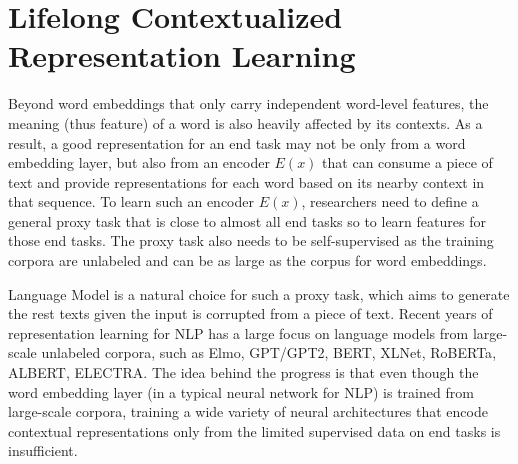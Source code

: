 

\chapter{Lifelong Contextualized Representation Learning}
\label{chap4:context}

Beyond word embeddings that only carry independent word-level features, the meaning (thus feature) of a word is also heavily affected by its contexts.
As a result, a good representation for an end task may not be only from a word embedding layer, but also from an encoder $E(x)$ that can consume a piece of text and provide representations for each word based on its nearby context in that sequence.
To learn such an encoder $E(x)$, researchers need to define a general proxy task that is close to almost all end tasks so to learn features for those end tasks.
The proxy task also needs to be self-supervised as the training corpora are unlabeled and can be as large as the corpus for word embeddings.

Language Model is a natural choice for such a proxy task, which aims to generate the rest texts given the input is corrupted from a piece of text.
Recent years of representation learning for NLP has a large focus on language models from large-scale unlabeled corpora, such as Elmo\cite{peters2018deep}, GPT/GPT2\cite{radford2018improving,radford2019language}, BERT\cite{devlin2018bert}, XLNet\cite{yang2019xlnet}, RoBERTa\cite{liu2019roberta}, ALBERT\cite{lan2019albert}, ELECTRA\cite{clark2019electra}.
The idea behind the progress is that even though the word embedding \cite{mikolov2013distributed,pennington2014glove} layer (in a typical neural network for NLP) is trained from large-scale corpora, training a wide variety of neural architectures that encode contextual representations only from the limited supervised data on end tasks is insufficient.

